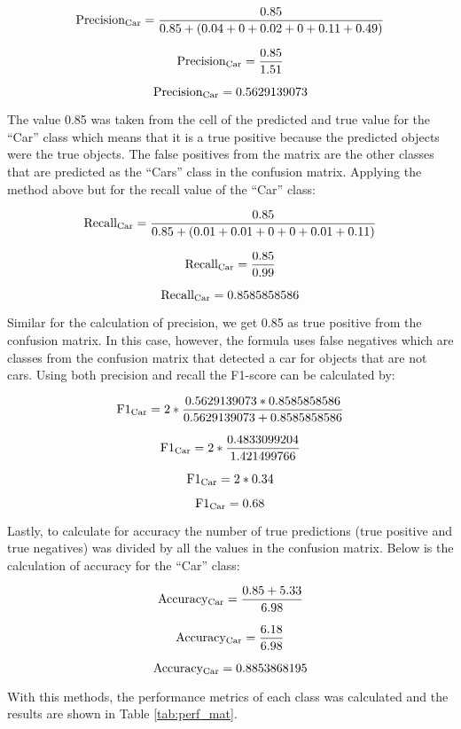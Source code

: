 \[{\text{Precision\textsubscript{Car}}}= \frac{0.85}{0.85+(0.04+0+0.02+0+0.11+0.49)} \]

\[{\text{Precision\textsubscript{Car}}}= \frac{0.85}{1.51} \]

\[{\text{Precision\textsubscript{Car}}}= 0.5629139073 \]

The value 0.85 was taken from the cell of the predicted and true value for the “Car” class which means that it is a true positive because the predicted objects were the true objects. The false positives from the matrix are the other classes that are predicted as the “Cars” class in the confusion matrix. Applying the method above but for the recall value of the “Car” class:


\[{\text{Recall\textsubscript{Car}}}= \frac{0.85}{0.85+(0.01+0.01+0+0+0.01+0.11)} \]

\[{\text{Recall\textsubscript{Car}}}= \frac{0.85}{0.99} \]

\[{\text{Recall\textsubscript{Car}}}= 0.8585858586 \]

Similar for the calculation of precision, we get 0.85 as true positive from the confusion matrix. In this case, however, the formula uses false negatives which are classes from the confusion matrix that detected a car for objects that are not cars. Using both precision and recall the F1-score can be calculated by:

\[{\text{F1}\textsubscript{Car}}= 2 * \frac{0.5629139073*0.8585858586}{0.5629139073+0.8585858586} \]

\[{\text{F1}\textsubscript{Car}}= 2 * \frac{0.4833099204}{1.421499766} \]

\[{\text{F1}\textsubscript{Car}}= 2 * 0.34 \]

\[{\text{F1}\textsubscript{Car}}= 0.68 \]

Lastly, to calculate for accuracy the number of true predictions (true positive and true negatives) was divided by all the values in the confusion matrix. Below is the calculation of accuracy for the “Car” class:

\[{\text{Accuracy}\textsubscript{Car}}= \frac{0.85 + 5.33}{6.98} \]

\[{\text{Accuracy}\textsubscript{Car}}=  \frac{6.18}{6.98} \]


\[{\text{Accuracy}\textsubscript{Car}}= 0.8853868195 \]


With this methods, the performance metrics of each class was calculated and the results are shown in Table \ref{tab:perf_mat}. 



